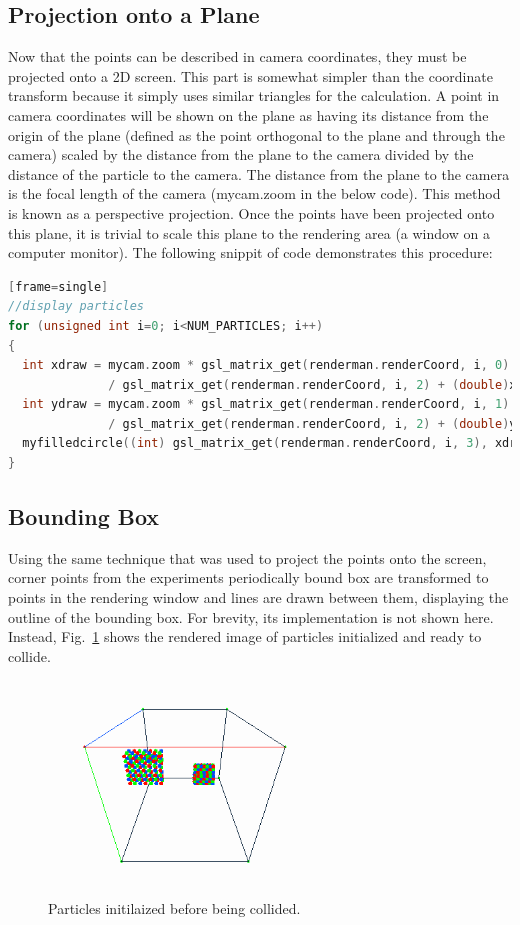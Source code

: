 \documentclass{article}
\begin{document}
\subsection{Projection onto a Plane}
Now that the points can be described in camera coordinates, they must be projected onto a 2D screen. This part is 
somewhat simpler than the coordinate transform because it simply uses similar triangles for the calculation. 
A point in camera coordinates will be shown on the plane as having its distance from the origin of the plane
(defined as the point orthogonal to the plane and through the camera) scaled by the distance from the plane
to the camera divided by the distance of the particle to the camera. The distance from the plane to the camera
is the focal length of the camera (mycam.zoom in the below code). This method is known as a perspective projection. 
Once the points have been projected onto this plane, it is trivial to scale this plane to the rendering area 
(a window on a computer monitor). The following snippit of code demonstrates this procedure:

\begin{lstlisting}[language=c][frame=single]
//display particles
for (unsigned int i=0; i<NUM_PARTICLES; i++)
{
  int xdraw = mycam.zoom * gsl_matrix_get(renderman.renderCoord, i, 0) 
              / gsl_matrix_get(renderman.renderCoord, i, 2) + (double)xdim/2.0;
  int ydraw = mycam.zoom * gsl_matrix_get(renderman.renderCoord, i, 1) 
              / gsl_matrix_get(renderman.renderCoord, i, 2) + (double)ydim/2.0;
  myfilledcircle((int) gsl_matrix_get(renderman.renderCoord, i, 3), xdraw, ydraw, 3);
}
\end{lstlisting}


\subsection{Bounding Box}
Using the same technique that was used to project the points onto the screen, corner points from the experiments
periodically bound box are transformed to points in the rendering window and lines are drawn between them, displaying
the outline of the bounding box. For brevity, its implementation is not shown here. Instead, Fig.~\ref{fig:partbefore}
shows the rendered image of particles initialized and ready to collide.

\begin{figure}[b!]
\centering
\includegraphics[width=3.0in]{./imgs/particlesbefore}
\caption{Particles initilaized before being collided.}
\label{fig:partbefore}
\end{figure}
\end{document}
